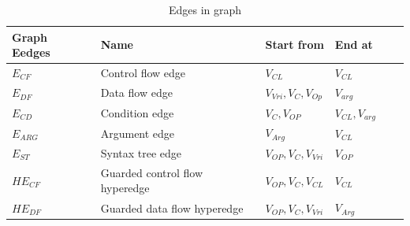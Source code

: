 \documentclass{article}
\begin{document}
\begin{table}[h]\caption{Edges in graph} \label{GraphDescriptionEdges}
\begin{center}
\begin{tabular}{lp{5cm}p{3cm}p{3cm}p{3cm}p{3cm}}
\hline
Graph Eedges & Name  & Start from & End at \\
\hline
$E_{CF}$ & Control flow edge                                                    &$V_{CL}$ & $V_{CL}$\\
$E_{DF}$ & Data flow edge                                                    &$V_{Vri},V_{C},V_{Op}$ & $V_{arg}$\\
$E_{CD}$ &  Condition edge                                                       &$V_{C},V_{OP}$ & $V_{CL},V_{arg}$\\
$E_{ARG}$ & Argument edge                                                        &$V_{Arg}$ & $V_{CL}$\\
$E_{ST}$ & Syntax tree edge                                                    &$V_{OP},V_{C},V_{Vri}$ & $V_{OP}$\\
$HE_{CF}$ & Guarded control flow hyperedge                                       & $V_{OP},V_{C}, V_{CL}$      & $V_{CL}$\\
$HE_{DF}$ & Guarded data flow hyperedge                                          & $V_{OP},V_{C},V_{Vri}$     & $V_{Arg}$\\
\hline
\end{tabular}
\end{center}
\end{table}





%
\end{document}
